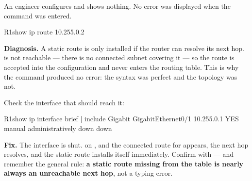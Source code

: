 \begin{breakfix}
An engineer configures  and
 shows nothing. No error was displayed when the command
was entered.

\begin{verify}{R1}{show ip route 10.255.0.2}
\end{verify}

\textbf{Diagnosis.} A static route is only installed if the router can resolve its
next hop.  is not reachable --- there is no connected subnet
covering it --- so the route is accepted into the configuration and never enters
the routing table. This is why the command produced no error: the syntax was
perfect and the topology was not.

Check the interface that should reach it:

\begin{verify}{R1}{show ip interface brief | include Gigabit}
GigabitEthernet0/1     10.255.0.1      YES manual administratively down down
\end{verify}

\textbf{Fix.} The interface is shut.  on , and the
connected route for  appears, the next hop resolves, and the
static route installs itself immediately. Confirm with 
--- and remember the general rule: \textbf{a static route missing from the table
is nearly always an unreachable next hop}, not a typing error.
\end{breakfix}

